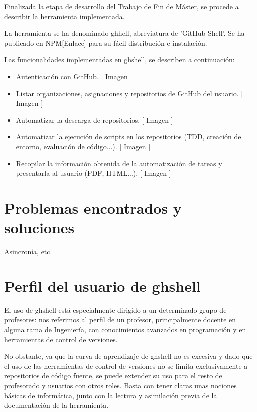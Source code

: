 

Finalizada la etapa de desarrollo del Trabajo de Fin de Máster, se procede a describir la herramienta implementada.


La herramienta se ha denominado ghhell, abreviatura de 'GitHub Shell'. Se ha publicado en NPM[Enlace] para su fácil distribución e instalación.

Las funcionalidades implementadas en ghshell, se describen a continuación:

\begin{itemize}
    \item Autenticación con GitHub.
        		[ Imagen ]
    \item Listar organizaciones, asignaciones y repositorios de GitHub del usuario.
        		[ Imagen ]
    \item Automatizar la descarga de repositorios.
        		[ Imagen ]
    \item Automatizar la ejecución de scripts en los repositorios (TDD, creación de entorno, evaluación de código...).
        		[ Imagen ]
    \item Recopilar la información obtenida de la automatización de tareas y presentarla al usuario (PDF, HTML...).
        		[ Imagen ]
\end{itemize}


\section{Problemas encontrados y soluciones}
\label{3:sec:1}

Asincronía, etc.

\section{Perfil del usuario de ghshell}
\label{3:sec:2}

El uso de ghshell está especialmente dirigido a un determinado grupo de profesores: nos referimos al perfil de un profesor, principalmente docente en alguna rama de Ingeniería, con conocimientos avanzados en programación y en herramientas de control de versiones.

No obstante, ya que la curva de aprendizaje de ghshell no es excesiva y dado que el uso de las herramientas de control de versiones no se limita exclusivamente a repositorios de código fuente, se puede extender su uso para el resto de profesorado y usuarios con otros roles. Basta con tener claras unas nociones básicas de informática, junto con la lectura y asimilación previa de la documentación de la herramienta.
